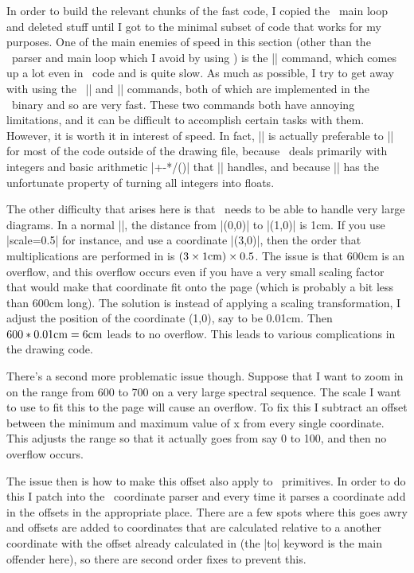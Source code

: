 In order to build the relevant chunks of the fast code, I copied the \tikzname\ main loop and deleted stuff until I got to the minimal subset of code that works for my purposes.
One of the main enemies of speed in this section (other than the \tikzname\ parser and main loop which I avoid by using \pgfpkg) is the |\pgfmathparse| command, which comes up a lot even in \pgfpkg\ code and is quite slow. As much as possible, I try to get away with using the \eTeX\ |\numexpr| and |\dimexpr| commands, both of which are implemented in the \eTeX\ binary and so are very fast. These two commands both have annoying limitations, and it can be difficult to accomplish certain tasks with them. However, it is worth it in interest of speed. In fact, |\numexpr| is actually preferable to |\pgfmathparse| for most of the code outside of the drawing file, because \sseqpages\ deals primarily with integers and basic arithmetic |+-*/()| that |\numexpr| handles, and because |\pgfmathparse| has the unfortunate property of turning all integers into floats.

The other difficulty that arises here is that \spectralsequences\ needs to be able to handle very large diagrams. In a normal |\tikzpicture|, the distance from |(0,0)| to |(1,0)| is 1cm. If you use |scale=0.5| for instance, and use a coordinate |(3,0)|, then the order that multiplications are performed in is $(3\times 1\textup{cm})\times 0.5$. The issue is that 600cm is an overflow, and this overflow occurs even if you have a very small scaling factor that would make that coordinate fit onto the page (which is probably a bit less than 600cm long). The solution is instead of applying a scaling transformation, I adjust the position of the coordinate (1,0), say to be 0.01cm. Then $600*0.01\textup{cm}= 6\textup{cm}$ leads to no overflow. This leads to various complications in the drawing code.

There's a second more problematic issue though. Suppose that I want to zoom in on the range from 600 to 700 on a very large spectral sequence. The scale I want to use to fit this to the page will cause an overflow. To fix this I subtract an offset between the minimum and maximum value of x from every single coordinate. This adjusts the range so that it actually goes from say 0 to 100, and then no overflow occurs.

The issue then is how to make this offset also apply to \tikzname\ primitives. In order to do this I patch into the \tikzname\ coordinate parser and every time it parses a coordinate add in the offsets in the appropriate place. There are a few spots where this goes awry and offsets are added to coordinates that are calculated relative to a another coordinate with the offset already calculated in (the |to| keyword is the main offender here), so there are second order fixes to prevent this.


 